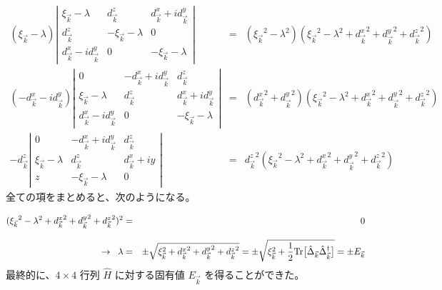 \documentclass[uplatex,a4j,12pt,dvipdfmx]{jsarticle}
\begin{document}
\begin{eqnarray}
	({\xi_{\vec{k}}} - \lambda)
	\left|
	\begin{array}{ccc}
		{\xi_{\vec{k}}} - \lambda              & {d^{z}_{\vec{k}}}          & {d^{x}_{\vec{k}}} + i{d^{y}_{\vec{k}}} \\[2mm]
		{d^{z}_{\vec{k}}}                      & - {\xi_{\vec{k}}} -\lambda & 0                                      \\[2mm]
		{d^{x}_{\vec{k}}} - i{d^{y}_{\vec{k}}} & 0                          & - {\xi_{\vec{k}}} -\lambda
	\end{array}
	\right|
	&=&
	( {\xi_{\vec{k}}}^{2} - \lambda^{2} )
	( {\xi_{\vec{k}}}^{2} - \lambda^{2} + {d^{x}_{\vec{k}}}^{2} +{d^{y}_{\vec{k}}}^{2} + {d^{z}_{\vec{k}}}^{2} )
	\\[3mm]
	(- {d^{x}_{\vec{k}}} - i{d^{y}_{\vec{k}}})
	\left|
	\begin{array}{ccc}
		0                                      & - {d^{x}_{\vec{k}}} + i{d^{y}_{\vec{k}}} & {d^{z}_{\vec{k}}}                      \\[2mm]
		{\xi_{\vec{k}}} - \lambda              & {d^{z}_{\vec{k}}}                        & {d^{x}_{\vec{k}}} + i{d^{y}_{\vec{k}}} \\[2mm]
		{d^{x}_{\vec{k}}} - i{d^{y}_{\vec{k}}} & 0                                        & - {\xi_{\vec{k}}} -\lambda
	\end{array}
	\right|
	&=&
	({d^{x}_{\vec{k}}}^{2} +{d^{y}_{\vec{k}}}^{2})
	( {\xi_{\vec{k}}}^{2} - \lambda^{2} + {d^{x}_{\vec{k}}}^{2} +{d^{y}_{\vec{k}}}^{2} + {d^{z}_{\vec{k}}}^{2} )
	\\[3mm]
	-
	{d^{z}_{\vec{k}}}
	\left|
	\begin{array}{ccc}
		0                         & - {d^{x}_{\vec{k}}} + i{d^{y}_{\vec{k}}} & {d^{z}_{\vec{k}}}      \\[2mm]
		{\xi_{\vec{k}}} - \lambda & {d^{z}_{\vec{k}}}                        & {d^{x}_{\vec{k}}} + iy \\[2mm]
		z                         & - {\xi_{\vec{k}}} -\lambda               & 0
	\end{array}
	\right|
	&=&
	{d^{z}_{\vec{k}}}^{2}
	( {\xi_{\vec{k}}}^{2} - \lambda^{2} + {d^{x}_{\vec{k}}}^{2} +{d^{y}_{\vec{k}}}^{2} + {d^{z}_{\vec{k}}}^{2} )
\end{eqnarray}
%
全ての項をまとめると、次のようになる。

\begin{eqnarray}
	( {\xi_{\vec{k}}}^{2} - \lambda^{2} + {d^{x}_{\vec{k}}}^{2} +{d^{y}_{\vec{k}}}^{2} + {d^{z}_{\vec{k}}}^{2} )^{2}
	&=&
	0
	\\[3mm]
	\to \hspace{2mm}
	\lambda
	&=&
	\pm \sqrt{ \xi_{\vec{k}}^{2} + {d^{x}_{\vec{k}}}^{2} + {d^{y}_{\vec{k}}}^{2} + {d^{z}_{\vec{k}}}^{2} }
	=
	\pm \sqrt{ \xi_{\vec{k}}^{2} + \dfrac{1}{2} {\rm Tr} \big[ \hat{\Delta}_{\vec{k}} \hat{\Delta}^{\dagger}_{\vec{k}} \big] }
	=
	\pm E_{\vec{k}}
\end{eqnarray}
%
最終的に、$4 \times 4$ 行列 $\hat{H}$ に対する固有値 $E_{\vec{k}}$ を得ることができた。
\end{document}
